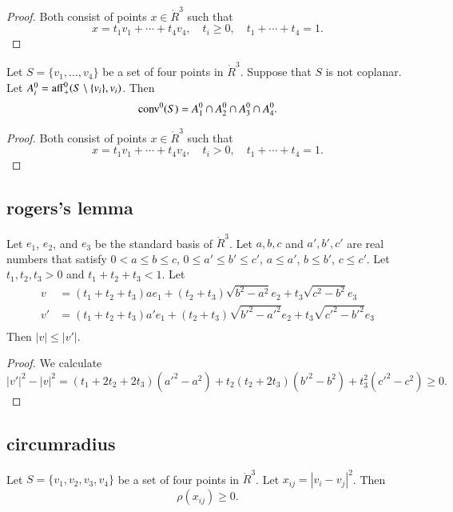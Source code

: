 \begin{proof}
Both consist of points $x\in\ring{R}^3$ such that
  $$x = t_1 v_1 +\cdots+ t_4 v_4,\quad t_i\ge 0,\quad t_1+\cdots +t_4 =1.
  $$
\end{proof}

\begin{lemma}
Let $S=\{v_1,\ldots, v_4\}$ be a set of four points
in $\ring{R}^3$.  Suppose that $S$ is not coplanar.
Let $A^0_i = {\operatorname{aff}}^0_+(S\setminus\{v_i\},v_i)$.
Then $${\operatorname{conv}}^0(S)  = A^0_1 \cap A^0_2 \cap A^0_3 \cap A^0_4.$$
\end{lemma}

\begin{proof}  Both consist of points $x\in\ring{R}^3$ such that
  $$x = t_1 v_1 +\cdots+ t_4 v_4,\quad t_i> 0,\quad t_1+\cdots +t_4 =1.
  $$
\end{proof}

\newpage
\subsection{rogers's lemma}

\begin{lemma}
Let $e_1$, $e_2$, and $e_3$ be the standard basis of
$\ring{R}^3$.  Let  $a,b,c$ and $a',b',c'$
are real numbers that satisfy $0 <a \le b \le c$, $0 \le a'\le b'\le c'$,
$a \le a'$, $b \le b'$, $c \le c'$. 
Let $t_1,t_2,t_3>0$ and $t_1+t_2+t_3< 1$.  Let
   $$
   \begin{array}{lll}
   v &= (t_1+t_2+t_3) a e_1 + (t_2+t_3) \sqrt{b^2-a^2} e_2 + t_3
   \sqrt{c^2-b^2} e_3\\
   v' &= (t_1+t_2+t_3) a' e_1 + (t_2+t_3) \sqrt{b'^2-a'^2} e_2 + t_3
   \sqrt{c'^2-b'^2} e_3\\
    \end{array}
    $$
    Then $|v| \le |v'|$.
\end{lemma}

\begin{proof}
  We calculate
  $$
  |v'|^2-|v|^2 = (t_1+2t_2+2t_3)(a'^2-a^2) + t_2 (t_2+2t_3)(b'^2-b^2)
    +t_3^2 (c'^2-c^2)\ge0.
  $$
\end{proof}

\newpage
\subsection{circumradius}

\begin{lemma}
Let $S=\{v_1,v_2,v_3,v_4\}$ be
a set of four points in $\ring{R}^3$.  Let
$x_{ij}=|v_i-v_j|^2$.  Then
	$$\rho(x_{ij})\ge 0.$$
\end{lemma}

